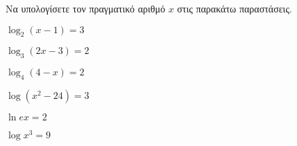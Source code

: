 Να υπολογίσετε τον πραγματικό αριθμό $ x $ στις παρακάτω παραστάσεις.
\begin{multicols}{2}
\begin{rlist}[leftmargin=5mm]
\item $ \log_{2}{(x-1)}=3 $
\item $ \log_{3}{(2x-3)}=2 $
\item $ \log_{4}{(4-x)}=2 $
\item $ \log{\left( x^2-24\right) }=3 $
\item $ \ln{ex}=2 $
\item $ \log{x^3}=9 $
\end{rlist}
\end{multicols}
